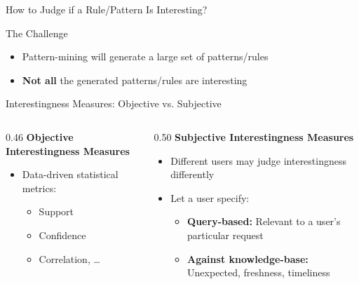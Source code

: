 \documentclass[aspectratio=169, 11pt]{beamer}
\begin{document}
\begin{frame}{How to Judge if a Rule/Pattern Is Interesting?}
    \begin{alertblock}{The Challenge}
        \begin{itemize}
            \item Pattern-mining will generate a large set of patterns/rules
            \item \textbf{Not all} the generated patterns/rules are interesting
        \end{itemize}
    \end{alertblock}
    \vspace{0.2cm}
    \begin{block}{Interestingness Measures: Objective vs. Subjective}
        \begin{columns}[T]
            \begin{column}{0.46\textwidth}
                \textbf{Objective Interestingness Measures}
                \begin{itemize}
                    \item Data-driven statistical metrics:
                    \begin{itemize}
                        \item Support
                        \item Confidence
                        \item Correlation, \dots
                    \end{itemize}
                \end{itemize}
            \end{column}
            \begin{column}{0.50\textwidth}
                \textbf{Subjective Interestingness Measures}
                \begin{itemize}
                    \item Different users may judge interestingness differently
                    \item Let a user specify:
                    \begin{itemize}
                        \item \textbf{Query-based:} Relevant to a user's particular request
                        \item \textbf{Against knowledge-base:} Unexpected, freshness, timeliness
                    \end{itemize}
                \end{itemize}
            \end{column}
        \end{columns}
    \end{block}
\end{frame}
\end{document}
